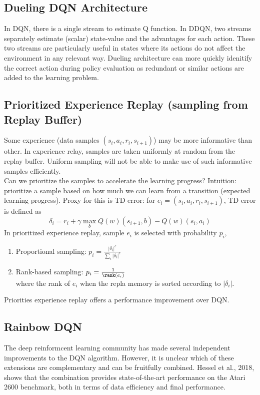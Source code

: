 \subsection{Dueling DQN Architecture}
In DQN, there is a single stream to estimate Q function. In DDQN, two streams separately estimate (scalar) state-value and the advantages for each action. These two streams are particularly useful in states where its actions do not affect the environment in any relevant way.
Dueling architecture can more quickly idenitify the correct action during policy evaluation as redundant or similar actions are added to the learning problem.

\subsection{Prioritized Experience Replay (sampling from Replay Buffer)}
Some experience (data samples $(s_i, a_i, r_i, s_{i+1})$) may be more informative than other. In experience relay, samples are taken uniformly at random from the replay buffer. Uniform sampling will not be able to make use of such informative samples efficiently. \\

\noindent Can we prioritize the samples to accelerate the learning progress? Intuition: prioritize a sample based on how much we can learn from a transition (expected learning progress). Proxy for this is TD error: for $e_i = (s_i, a_i, r_i, s_{i+1})$, TD error is defined as
\[
  \delta_i = r_i + \gamma \max_{b}Q(w)(s_{i+1}, b) - Q(w)(s_i, a_i)
\]
In prioritized experience replay, sample $e_i$ is selected with probability $p_i$,
\begin{enumerate}[label=\textbf{--}, topsep=5pt, itemsep=-5pt]
  \item Proportional sampling: $p_i = \frac{|\delta_i|^c}{\sum_{i}|\delta_i|^c}$
  \item Rank-based sampling: $p_i = \frac{1}{\rank(e_i)}$ \\
        where the rank of $e_i$ when the repla memory is sorted according to $|\delta_i|$.
\end{enumerate}
Priorities experience replay offers a performance improvement over DQN.
\subsection{Rainbow DQN}
The deep reinformcent learning community has made several independent improvements to the DQN
algorithm. However, it is unclear which of these extensions are complementary and can be fruitfully combined.
Hessel et al., 2018,  shows that the combination provides state-of-the-art performance on the Atari 2600 benchmark, both in terms of data efficiency and final performance.

